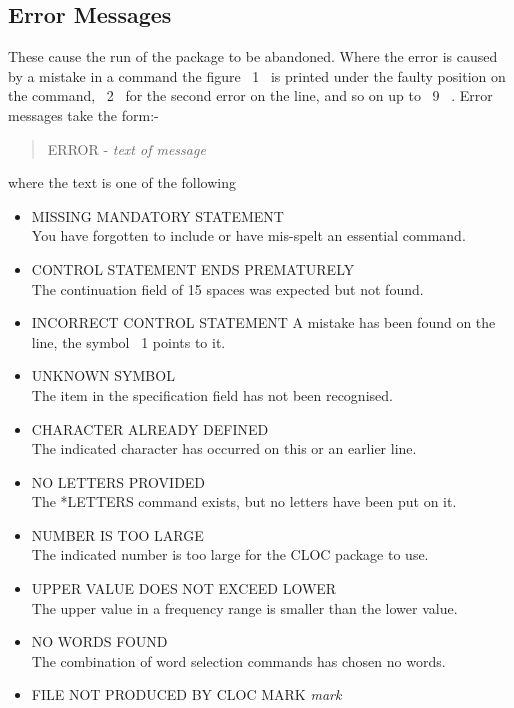 \subsection{Error Messages}
 These cause the run of the package to be abandoned.  Where the error is
 caused by a mistake in a command the figure ~1~ is printed under the
 faulty position on the command, ~2~ for the second error on the line,
 and so on up to ~9~ . Error messages take the form:-
\begin{quote}
 ERROR - {\em text of message}
\end{quote}
where the text is one of the following
\begin{itemize}
\item MISSING MANDATORY STATEMENT\\
                 You have forgotten to include or have mis-spelt an
                 essential command.
\item CONTROL STATEMENT ENDS PREMATURELY\\
                 The continuation field of 15 spaces was expected but
                 not found.
\item INCORRECT CONTROL STATEMENT
                 A mistake has been found on the line, the symbol \ 1
                 points to it.
\item UNKNOWN SYMBOL\\
                 The item in the specification field has not been
                 recognised.
\item CHARACTER ALREADY DEFINED\\
                 The indicated character has occurred on this or an earlier
                 line.
\item NO LETTERS PROVIDED\\
                 The *LETTERS command exists, but no letters have been
                 put on it.
\item NUMBER IS TOO LARGE\\
                 The indicated number is too large for the CLOC
                 package to use.
\item UPPER VALUE DOES NOT EXCEED LOWER\\
                 The upper value in a frequency range is smaller than
                 the lower value.
\item NO WORDS FOUND\\
                 The combination of word selection commands has chosen
                 no words.
\item FILE NOT PRODUCED BY CLOC MARK {\em mark}\\

\end{itemize}
